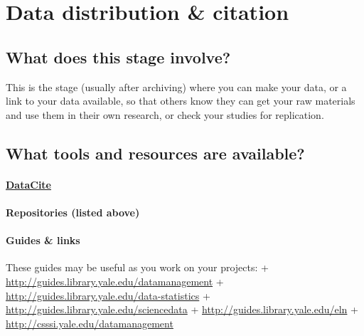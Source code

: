 \documentclass{tufte-handout}
\begin{document}
\section{Data distribution \&
citation}\label{data-distribution-citation} 

\subsection{What does this stage
involve?}\label{what-does-this-stage-involve-1}

This is the stage (usually after archiving) where you can make your
data, or a link to your data available, so that others know they can get
your raw materials and use them in their own research, or check your
studies for replication.

\subsection{What tools and resources are
available?}\label{what-tools-and-resources-are-available-3}

\paragraph{\href{https://www.datacite.org/}{DataCite}}\label{datacite}

\paragraph{Repositories (listed above)}\label{repositories-listed-above}



\paragraph{Guides \& links}\label{guides-links}

These guides may be useful as you work on your projects: +
\url{http://guides.library.yale.edu/datamanagement} +
\url{http://guides.library.yale.edu/data-statistics} +
\url{http://guides.library.yale.edu/sciencedata} +
\url{http://guides.library.yale.edu/eln} +
\url{http://csssi.yale.edu/datamanagement}
\end{document}
